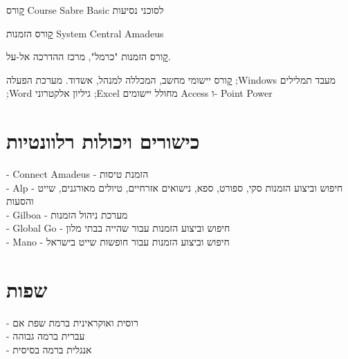 {\href{https://raw.githubusercontent.com/kiril-u/k-resume-2021-1-template/main/references/basic-sabre-course.jpg}
	קורס Course Sabre Basic לסוכני נסיעות}
{}
{}

{\href{https://raw.githubusercontent.com/kiril-u/k-resume-2021-1-template/main/references/amadeus-central-system.jpg}
קורס הזמנות
System Central Amadeus
}
{}
{}

{\href{https://raw.githubusercontent.com/kiril-u/k-resume-2021-1-template/main/references/el-al-carmel.jpg}קורס הזמנות "כרמל", מרכז ההדרכה אל-על.}
{}
{}


 {
	\href{https://raw.githubusercontent.com/kiril-u/k-resume-2021-1-template/main/references/computer-programs-cert.jpg}
	קורס יישומי מחשב, המכללה למנהל, אשדוד.}
 {מערכת הפעלה ;Windows
 מעבד תמלילים ;Word
 גיליון אלקטרוני ;Excel מחולל יישומים 
 Access ו- Point Power}
{}
{}





\section{כישורים ויכולות רלוונטיות}
{- Connect Amadeus - הזמנת טיסות \\
	- Alp - חיפוש וביצוע הזמנות סקי, ספורט, ספא, נישואים אזרחיים, טיולים מאורגנים,   שייט והסעות
	\\
	- Gilboa - מערכת ניהול הזמנות \\
 	- Global Go - חיפוש וביצוע הזמנות עבור שהייה בבתי מלון \\
	- Mano - חיפוש וביצוע הזמנות עבור חופשות שייט בישראל}{}{}

\section{שפות}
{
- רוסית ואוקראינית ברמת שפת אם \\
- עברית ברמה גבוהה \\
- אנגלית ברמה בסיסית}
{}
{}



\unsetRTL